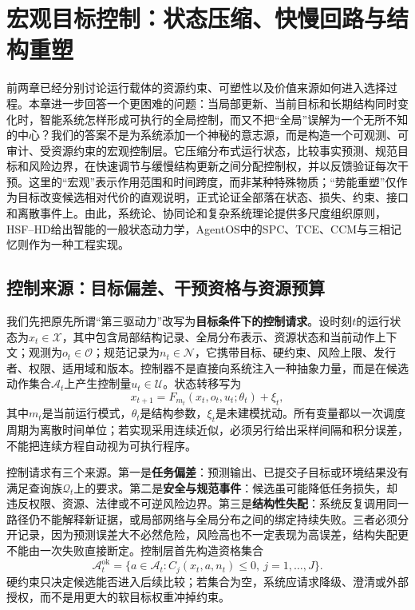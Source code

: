 \chapter{宏观目标控制：状态压缩、快慢回路与结构重塑}
\label{chp:macroscopic_layer_ch}

前两章已经分别讨论运行载体的资源约束、可塑性以及价值来源如何进入选择过程。本章进一步回答一个更困难的问题：当局部更新、当前目标和长期结构同时变化时，智能系统怎样形成可执行的全局控制，而又不把“全局”误解为一个无所不知的中心？我们的答案不是为系统添加一个神秘的意志源，而是构造一个可观测、可审计、受资源约束的宏观控制层。它压缩分布式运行状态，比较事实预测、规范目标和风险边界，在快速调节与缓慢结构更新之间分配控制权，并以反馈验证每次干预。这里的“宏观”表示作用范围和时间跨度，而非某种特殊物质；“势能重塑”仅作为目标改变候选相对代价的直观说明，正式论证全部落在状态、损失、约束、接口和离散事件上。由此，系统论、协同论和复杂系统理论提供多尺度组织原则，HSF--HD给出智能的一般状态动力学，AgentOS中的SPC、TCE、CCM与三相记忆则作为一种工程实现。

\section{控制来源：目标偏差、干预资格与资源预算}
\label{sec:source_of_force_parametric}

我们先把原先所谓“第三驱动力”改写为\textbf{目标条件下的控制请求}。设时刻$t$的运行状态为$x_t\in\mathcal{X}$，其中包含局部结构记录、全局分布表示、资源状态和当前动作上下文；观测为$o_t\in\mathcal{O}$；规范记录为$n_t\in\mathcal{N}$，它携带目标、硬约束、风险上限、发行者、权限、适用域和版本。控制器不是直接向系统注入一种抽象力量，而是在候选动作集合$\mathcal{A}_t$上产生控制量$u_t\in\mathcal{U}$。状态转移写为
\[
x_{t+1}=F_{m_t}(x_t,o_t,u_t;\theta_t)+\xi_t ,
\]
其中$m_t$是当前运行模式，$\theta_t$是结构参数，$\xi_t$是未建模扰动。所有变量都以一次调度周期为离散时间单位；若实现采用连续近似，必须另行给出采样间隔和积分误差，不能把连续方程自动视为可执行程序。

控制请求有三个来源。第一是\textbf{任务偏差}：预测输出、已提交子目标或环境结果没有满足查询族$\mathcal{Q}_t$上的要求。第二是\textbf{安全与规范事件}：候选虽可能降低任务损失，却违反权限、资源、法律或不可逆风险边界。第三是\textbf{结构性失配}：系统反复调用同一路径仍不能解释新证据，或局部网络与全局分布之间的绑定持续失败。三者必须分开记录，因为预测误差大不必然危险，风险高也不一定表现为高误差，结构失配更不能由一次失败直接断定。控制层首先构造资格集合
\[
\mathcal{A}^{\mathrm{ok}}_t=\{a\in\mathcal{A}_t:C_j(x_t,a,n_t)\le 0,\ j=1,\ldots,J\}.
\]
硬约束只决定候选能否进入后续比较；若集合为空，系统应请求降级、澄清或外部授权，而不是用更大的软目标权重冲掉约束。

